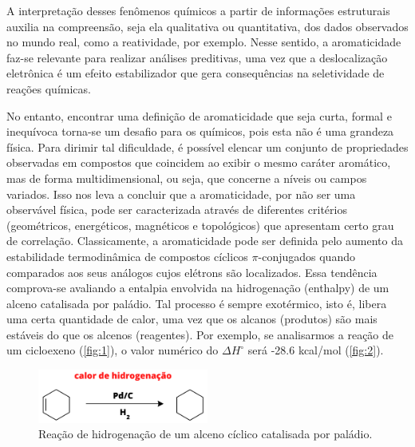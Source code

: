 A interpretação desses fenômenos químicos a partir de informações estruturais auxilia na compreensão, seja ela qualitativa ou quantitativa, dos dados observados no mundo real, como a reatividade, por exemplo. Nesse sentido, a aromaticidade faz-se relevante para realizar análises preditivas, uma vez que a deslocalização eletrônica é um efeito estabilizador que gera consequências na seletividade de reações químicas.

No entanto, encontrar uma definição de aromaticidade que seja curta, formal e inequívoca torna-se um desafio para os químicos, pois esta não é uma grandeza física. Para dirimir tal dificuldade, é possível elencar um conjunto de propriedades observadas em compostos que coincidem ao exibir o mesmo caráter aromático, mas de forma multidimensional, ou seja, que concerne a níveis ou campos variados. Isso nos leva a concluir que a aromaticidade, por não ser uma observável física, pode ser caracterizada através de diferentes critérios (geométricos, energéticos, magnéticos e topológicos) que apresentam certo grau de correlação. Classicamente, a aromaticidade pode ser definida pelo aumento da estabilidade termodinâmica de compostos cíclicos $\pi$-conjugados quando comparados aos seus análogos cujos elétrons são localizados. Essa tendência comprova-se avaliando a entalpia envolvida na hidrogenação (\gls{enthalpy}) de um alceno catalisada por paládio. Tal processo é sempre exotérmico, isto é, libera uma certa quantidade de calor, uma vez que os alcanos (produtos) são mais estáveis do que os alcenos (reagentes). Por exemplo, se analisarmos a reação de um cicloexeno (\autoref{fig:1}), o valor numérico do $\Delta H^\circ$ será -28.6 kcal/mol (\autoref{fig:2}). 


\begin{figure}[htb!]
	\caption{\label{fig:1} Reação de hidrogenação de um alceno cíclico catalisada por paládio.}
	\begin{center}
		\includegraphics[width=0.5\textwidth]{images/fig1.png}
	\end{center}
\end{figure}


